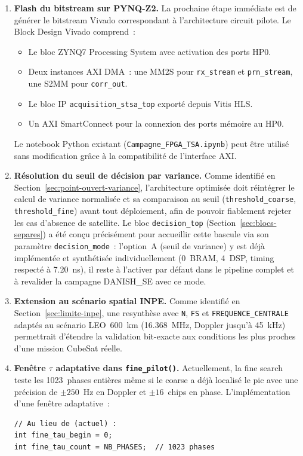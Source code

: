 \documentclass[11pt,a4paper]{article}
\begin{document}
\begin{enumerate}
  \item \textbf{Flash du bitstream sur PYNQ-Z2.} La prochaine étape immédiate est de générer le bitstream Vivado correspondant à l'architecture circuit pilote. Le Block Design Vivado comprend~:
    \begin{itemize}
      \item Le bloc ZYNQ7 Processing System avec activation des ports HP0.
      \item Deux instances AXI DMA~: une MM2S pour \texttt{rx\_stream} et \texttt{prn\_stream}, une S2MM pour \texttt{corr\_out}.
      \item Le bloc IP \texttt{acquisition\_stsa\_top} exporté depuis Vitis HLS.
      \item Un AXI SmartConnect pour la connexion des ports mémoire au HP0.
    \end{itemize}
    Le notebook Python existant (\texttt{Campagne\_FPGA\_TSA.ipynb}) peut être utilisé sans modification grâce à la compatibilité de l'interface AXI.

  \item \textbf{Résolution du seuil de décision par variance.} Comme identifié en Section~\ref{sec:point-ouvert-variance}, l'architecture optimisée doit réintégrer le calcul de variance normalisée et sa comparaison au seuil (\texttt{threshold\_coarse}, \texttt{threshold\_fine}) avant tout déploiement, afin de pouvoir fiablement rejeter les cas d'absence de satellite. Le bloc \texttt{decision\_top} (Section~\ref{sec:blocs-separes}) a été conçu précisément pour accueillir cette bascule via son paramètre \texttt{decision\_mode}~: l'option~A (seuil de variance) y est déjà implémentée et synthétisée individuellement (0~BRAM, 4~DSP, timing respecté à 7.20~ns), il reste à l'activer par défaut dans le pipeline complet et à revalider la campagne DANISH\_SE avec ce mode.

  \item \textbf{Extension au scénario spatial INPE.} Comme identifié en Section~\ref{sec:limite-inpe}, une resynthèse avec \texttt{N}, \texttt{FS} et \texttt{FREQUENCE\_CENTRALE} adaptés au scénario LEO~600~km (16.368~MHz, Doppler jusqu'à 45~kHz) permettrait d'étendre la validation bit-exacte aux conditions les plus proches d'une mission CubeSat réelle.

  \item \textbf{Fenêtre $\tau$ adaptative dans \texttt{fine\_pilot()}.} Actuellement, la fine search teste les 1023~phases entières même si le coarse a déjà localisé le pic avec une précision de $\pm250$~Hz en Doppler et $\pm16$~chips en phase. L'implémentation d'une fenêtre adaptative~:
    \begin{lstlisting}[numbers=none]
// Au lieu de (actuel) :
int fine_tau_begin = 0;
int fine_tau_count = NB_PHASES;  // 1023 phases


\end{lstlisting}
\end{enumerate}
\end{document}
